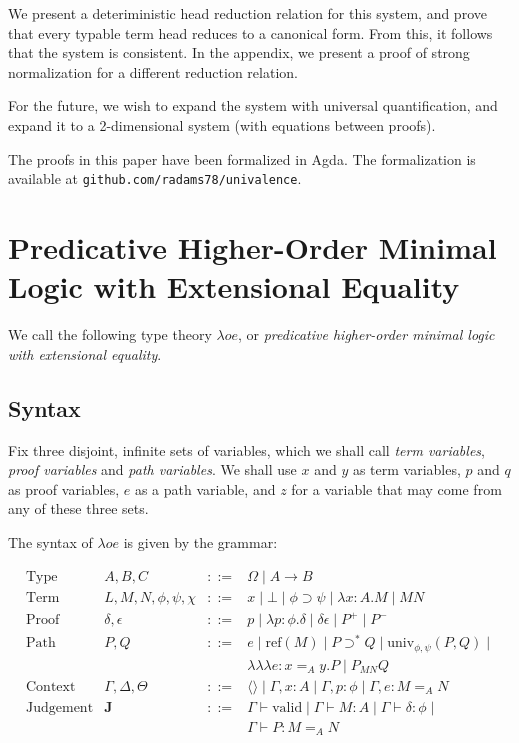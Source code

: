 \documentclass[a4paper,UKenglish]{lipics-v2016}
\newcommand*{\reff}[1]{\ensuremath{\mathrm{ref} \left( {#1} \right)}}
\newcommand*{\univ}[4]{\ensuremath{\mathrm{univ}_{{#1}, {#2}} \left({#3} , {#4} \right)}}
\newcommand*{\triplelambda}{\ensuremath{\lambda \!\! \lambda \!\! \lambda}}
\newcommand*{\vald}{\ensuremath{\vdash \mathrm{valid}}}
\theoremstyle{definition}
\begin{document}
We present a deteriministic head reduction relation for this system, and prove that every typable term head reduces to a canonical form.  From this, it follows that the system is consistent.  In the appendix, we present a proof of strong normalization for a different reduction relation.

For the future, we wish to expand the system with universal quantification, and expand it to a 2-dimensional system (with equations between proofs).

The proofs in this paper have been formalized in Agda.  The formalization is available at \texttt{github.com/radams78/univalence}.

\section{Predicative Higher-Order Minimal Logic with Extensional Equality}

We call the following type theory $\lambda o e$, or \emph{predicative higher-order minimal logic with extensional equality}.  

\subsection{Syntax}

Fix three disjoint, infinite sets of variables, which we shall call \emph{term variables}, \emph{proof variables}
and \emph{path variables}.  We shall use $x$ and $y$ as term variables, $p$ and $q$ as proof variables,
$e$ as a path variable, and $z$ for a variable that may come from any of these three sets.

The syntax of $\lambda o e$ is given by the grammar:

\[
\begin{array}{lrcl}
\text{Type} & A,B,C & ::= & \Omega \mid A \rightarrow B \\
\text{Term} & L,M,N, \phi,\psi,\chi & ::= & x \mid \bot \mid \phi \supset \psi \mid \lambda x:A.M \mid MN \\
\text{Proof} & \delta, \epsilon & ::= & p \mid \lambda p:\phi.\delta \mid \delta \epsilon \mid P^+ \mid P^- \\
\text{Path} & P, Q & ::= & e \mid \reff{M} \mid P \supset^* Q \mid \univ{\phi}{\psi}{P}{Q} \mid \\
& & & \triplelambda e : x =_A y. P \mid P_{MN} Q \\
\text{Context} & \Gamma, \Delta, \Theta & ::= & \langle \rangle \mid \Gamma, x : A \mid \Gamma, p : \phi \mid \Gamma, e : M =_A N \\
\text{Judgement} & \mathbf{J} & ::= & \Gamma \vald \mid \Gamma \vdash M : A \mid \Gamma \vdash \delta : \phi \mid \\
& & & \Gamma \vdash P : M =_A N
\end{array}
\]
\end{document}

